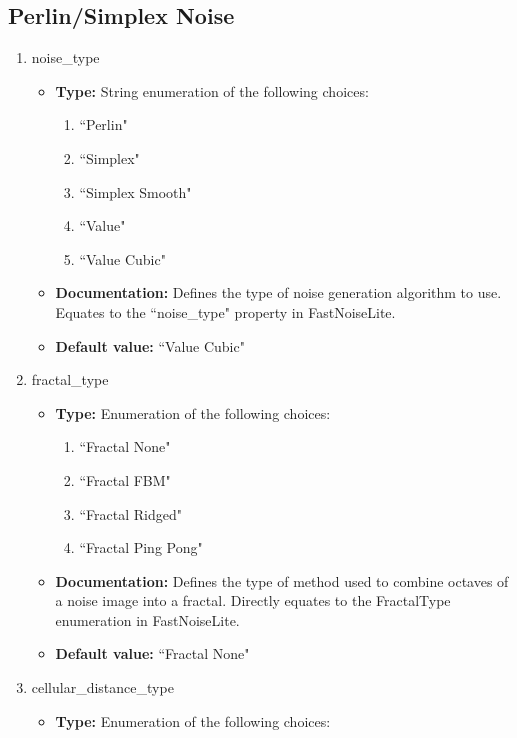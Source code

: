 \subsection{Perlin/Simplex Noise}

\begin{enumerate}
    \item noise\_type
    \begin{itemize}
        \item \textbf{Type:} String enumeration of the following choices:
        \begin{enumerate}
            \item ``Perlin"
            \item ``Simplex"
            \item ``Simplex Smooth"
            \item ``Value"
            \item ``Value Cubic"
        \end{enumerate}
        \item \textbf{Documentation:} Defines the type of noise generation algorithm to use. Equates to the ``noise\_type" property in FastNoiseLite.
        \item \textbf{Default value:} ``Value Cubic"
    \end{itemize}
    \item fractal\_type
    \begin{itemize}
        \item \textbf{Type:} Enumeration of the following choices:
        \begin{enumerate}
            \item ``Fractal None"
            \item ``Fractal FBM"
            \item ``Fractal Ridged"
            \item ``Fractal Ping Pong"
        \end{enumerate}
        \item \textbf{Documentation:} Defines the type of method used to combine octaves of a noise image into a fractal. Directly equates to the FractalType enumeration in FastNoiseLite.
        \item \textbf{Default value:} ``Fractal None" 
    \end{itemize}
    \item cellular\_distance\_type
    \begin{itemize}
        \item \textbf{Type:} Enumeration of the following choices:

\end{itemize}
\end{enumerate}
